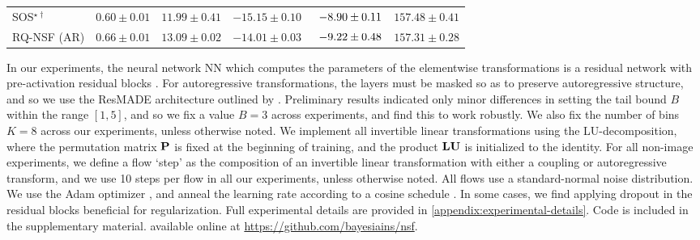 \begin{table}[t!]
\begin{center}
\begin{small}
\begin{sc}
\begin{tabular}{lccccc}
					SOS$^{\star\dagger}$ & $ 0.60 \pm 0.01 $ & $ 11.99 \pm 0.41 $ & $ -15.15 \pm 0.10 $ & $ \hphantom{0}{-8.90} \pm 0.11 $ & $ 157.48 \pm 0.41 $ \\
					RQ-NSF (AR) & $ 0.66 \pm 0.01 $ & $ 13.09 \pm 0.02 $ & $ -14.01 \pm 0.03 $ & $ \hphantom{0}{-9.22} \pm 0.48 $ & $ 157.31 \pm 0.28 $ \\
					\bottomrule
				\end{tabular}
			\end{sc}
		\end{small}
	\end{center}
	\vspace{-1.0em}
\end{table}

In our experiments, the neural network NN which computes the parameters of the elementwise transformations is a residual network \citep{he2016deep} with pre-activation  residual blocks \citep{he2016preact}. 
For autoregressive transformations, the layers must be masked so as to preserve autoregressive structure, and so we use the ResMADE architecture outlined by \citet{nash2019aem}. 
Preliminary results indicated only minor differences in setting the tail bound $ B $ within the range $ [1, 5] $, and so we fix a value $ B = 3 $ across experiments, and find this to work robustly.
We also fix the number of bins $ K = 8 $ across our experiments, unless otherwise noted.
We implement all invertible linear transformations using the LU-decomposition, where the permutation matrix $ \mathbf{P} $ is fixed at the beginning of training, and the product $ \mathbf{L} \mathbf{U} $ is initialized to the identity.
For all non-image experiments, we define a flow `step' as the composition of an invertible linear transformation with either a coupling or autoregressive transform, and we use 10 steps per flow in all our experiments, unless otherwise noted.
All flows use a standard-normal noise distribution.
We use the Adam optimizer \citep{kingma:2014:adam}, and anneal the learning rate according to a cosine schedule \citep{loshchilov:2016:sgdr}. 
In some cases, we find applying dropout \citep{srivastava:2014:dropout} in the residual blocks beneficial for regularization.
Full experimental details are provided in \cref{appendix:experimental-details}. Code is \ifanonymize included in the supplementary material. \else available online at \url{https://github.com/bayesiains/nsf}.

